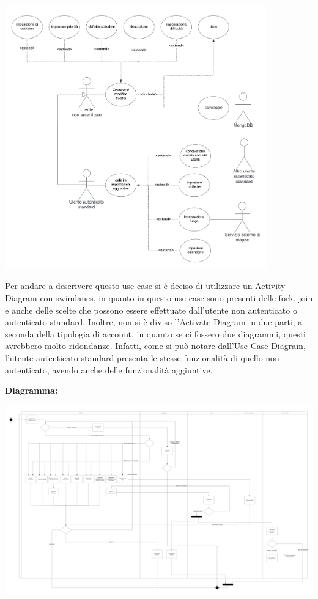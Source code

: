 \begin{listaPersonale}[UC]{}
    \begin{center}
        \includegraphics[width=0.85\textwidth, height = 0.5\textheight]{img/Diagrammi/UseCases/CreazioneModificaEvento.png}
    \end{center}
    Per andare a descrivere questo use case si è deciso di utilizzare un Activity Diagram con swimlanes, in quanto in questo use case sono presenti delle fork, join e anche delle scelte che possono essere effettuate dall'utente non autenticato o autenticato standard. Inoltre, non si è diviso l'Activate Diagram in due parti, a seconda della tipologia di account, in quanto se ci fossero due diagrammi, questi avrebbero molto ridondanze. Infatti, come si può notare dall'Use Case Diagram, l'utente autenticato standard presenta le stesse funzionalità di quello non autenticato, avendo anche delle funzionalità aggiuntive.
    \newpage

    \textbf{Diagramma:}
    \begin{center}
        \includegraphics[width=1.1\textwidth, height = 0.4\textheight]{img/Diagrammi/DS/DS_CreazioneModificaEvento.png}
    \end{center}





\end{listaPersonale}
